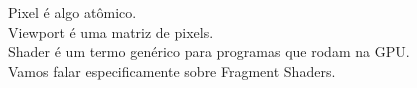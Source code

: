 \documentclass[preview]{standalone}
\begin{document}
Pixel é algo atômico.\\Viewport é uma matriz de pixels.\\Shader é um termo genérico para programas que rodam na GPU.\\Vamos falar especificamente sobre Fragment Shaders.\\
\end{document}
